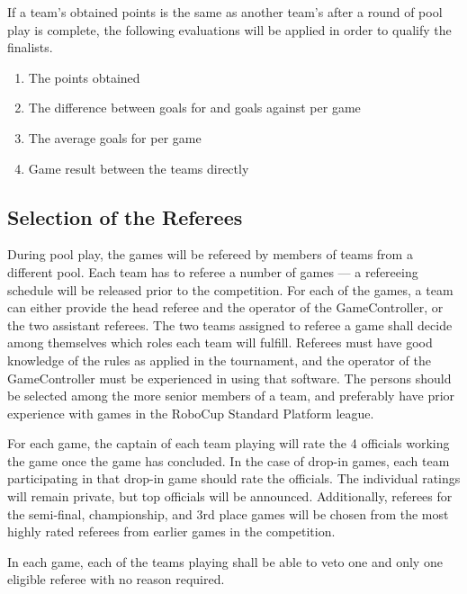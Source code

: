 \documentclass[12pt]{article}
\begin{document}
If a team's obtained points is the same as another team's after a round of pool play is complete, the following evaluations will be applied in order to qualify the finalists.

\begin{enumerate}

\item The points obtained

\item The difference between goals for and goals against per game

\item The average goals for per game

\item Game result between the teams directly

\end{enumerate}

\subsection{Selection of the Referees}
\label{sec:refSelection}
During pool play, the games will be refereed by members of teams from a different pool.  Each team has to referee a number of games --- a refereeing schedule will be released prior to the competition. For each of the games, a team can either provide the head referee and the operator of the GameController, or the two assistant referees.  The two teams assigned to referee a game shall decide among themselves which roles each team will fulfill.  Referees must have good knowledge of the rules as applied in the tournament, and the operator of the GameController must be experienced in using that software. The persons should be selected among the more senior members of a team, and preferably have prior experience with games in the RoboCup Standard Platform league.

For each game, the captain of each team playing will rate the 4 officials working the game once the game has concluded.  In the case of drop-in games, each team participating in that drop-in game should rate the officials.  The individual ratings will remain private, but top officials will be announced.  Additionally, referees for the semi-final, championship, and 3rd place games will be chosen from the most highly rated referees from earlier games in the competition.

In each game, each of the teams playing shall be able to veto one and only one eligible referee with no reason required.
\end{document}
